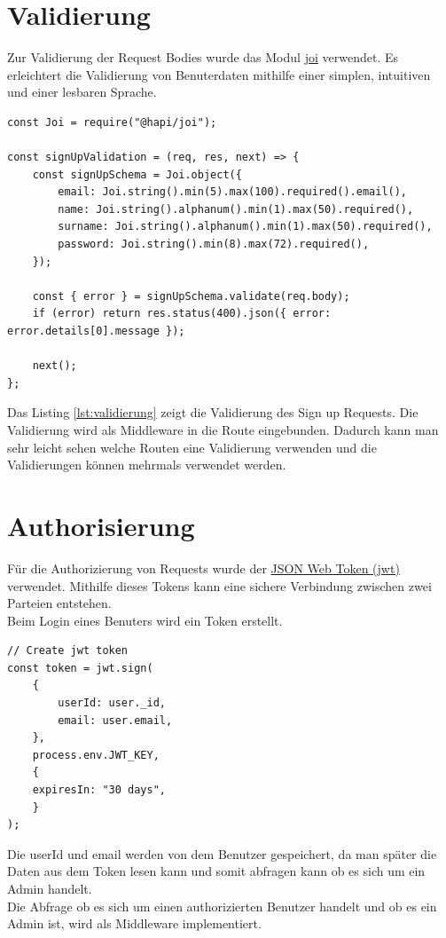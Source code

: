 \section{Validierung}
Zur Validierung der Request Bodies wurde das Modul \hyperlink{https://hapi.dev/module/joi/}{joi} verwendet. Es erleichtert die Validierung von Benuterdaten mithilfe einer simplen, intuitiven und einer lesbaren Sprache.

\begin{lstlisting}[caption={Validierung des Sign ups (backend > api > middleware > validation.js)},label={lst:validierung}]
const Joi = require("@hapi/joi");

const signUpValidation = (req, res, next) => {
    const signUpSchema = Joi.object({
        email: Joi.string().min(5).max(100).required().email(),
        name: Joi.string().alphanum().min(1).max(50).required(),
        surname: Joi.string().alphanum().min(1).max(50).required(),
        password: Joi.string().min(8).max(72).required(),
    });

    const { error } = signUpSchema.validate(req.body);
    if (error) return res.status(400).json({ error: error.details[0].message });

    next();
};
\end{lstlisting}

Das Listing \ref{lst:validierung} zeigt die Validierung des Sign up Requests. Die Validierung wird als Middleware in die Route eingebunden. Dadurch kann man sehr leicht sehen welche Routen eine Validierung verwenden und die Validierungen können mehrmals verwendet werden.

\section{Authorisierung}
Für die Authorizierung von Requests wurde der \hyperlink{https://jwt.io/}{JSON Web Token (jwt)} verwendet. Mithilfe dieses Tokens kann eine sichere Verbindung zwischen zwei Parteien entstehen.\\
Beim Login eines Benuters wird ein Token erstellt. 

\begin{lstlisting}[caption={Erstellung des Tokens (backend > api > controllers > user.js)},label={lst:token}]
// Create jwt token
const token = jwt.sign(
	{
		userId: user._id,
		email: user.email,
	},
	process.env.JWT_KEY,
	{
	expiresIn: "30 days",
	}
);
\end{lstlisting}

Die userId und email werden von dem Benutzer gespeichert, da man später die Daten aus dem Token lesen kann und somit abfragen kann ob es sich um ein Admin handelt.\\
Die Abfrage ob es sich um einen authorizierten Benutzer handelt und ob es ein Admin ist, wird als Middleware implementiert.


